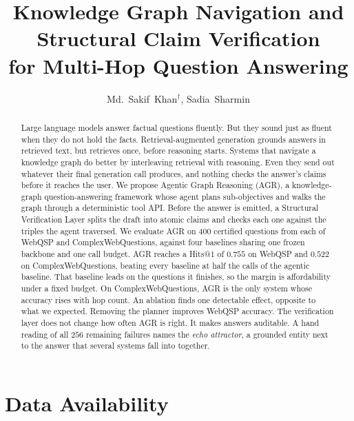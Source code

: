 \documentclass[10pt,twocolumn,a4paper]{article}
\title{Knowledge Graph Navigation and Structural Claim Verification\\
for Multi-Hop Question Answering}
\author{Md.~Sakif~Khan$^{\dagger}$, Sadia~Sharmin}
\affiliation{Department of Computer Science and Engineering\\
Bangladesh University of Engineering and Technology, Dhaka, Bangladesh}
\begin{document}

\maketitle

\begin{abstract}
Large language models answer factual questions fluently. But they sound just
as fluent when they do not hold the facts. Retrieval-augmented generation
grounds answers in retrieved text, but retrieves once, before reasoning starts.
Systems that navigate a knowledge graph do better by interleaving retrieval
with reasoning. Even they send out whatever their final generation call
produces, and nothing checks the answer's claims before it reaches the user.
We propose Agentic Graph Reasoning (AGR), a knowledge-graph question-answering
framework whose agent plans sub-objectives and walks the graph through a
deterministic tool API. Before the answer is emitted, a Structural Verification
Layer splits the draft into atomic claims and checks each one against the
triples the agent traversed. We evaluate AGR on $400$ certified questions from
each of WebQSP and ComplexWebQuestions, against four baselines sharing one
frozen backbone and one call budget. AGR reaches a Hits@1 of $0.755$ on WebQSP
and $0.522$ on ComplexWebQuestions, beating every baseline at half the calls of
the agentic baseline. That baseline leads on the questions it finishes, so the
margin is affordability under a fixed budget. On ComplexWebQuestions, AGR is
the only system whose accuracy rises with hop count. An ablation finds one
detectable effect, opposite to what we expected. Removing the planner improves
WebQSP accuracy. The verification layer does not change how often AGR is right.
It makes answers auditable. A hand reading of all $256$ remaining failures
names the \emph{echo attractor}, a grounded entity next to the answer that
several systems fall into together.
\end{abstract}












\section*{Data Availability}
\end{document}
